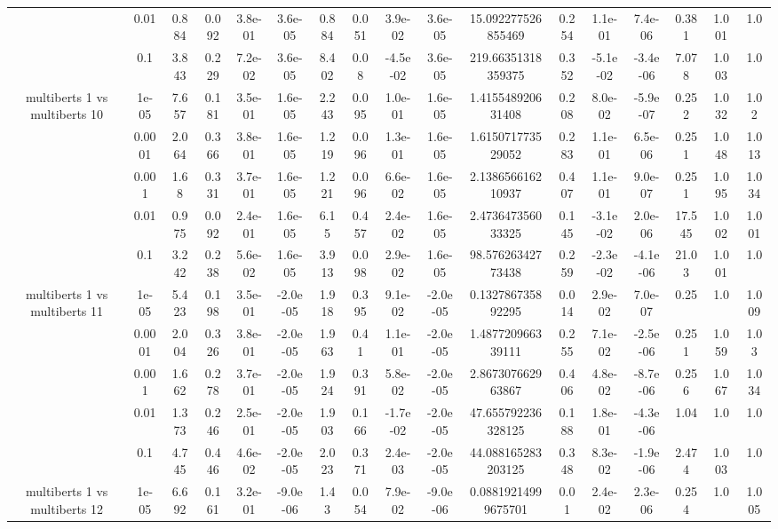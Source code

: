 \begin{tabular}{|c|c|c|c|c|c|c|c|c|c|c|c|c|c|c|c|c|}
 & 0.01 & 0.884 & 0.092 & 3.8e-01 & 3.6e-05 & 0.884 & 0.051 & 3.9e-02 & 3.6e-05 & 15.092277526855469 & 0.254 & 1.1e-01 & 7.4e-06 & 0.381 & 1.001 & 1.0 \\
 & 0.1 & 3.843 & 0.229 & 7.2e-02 & 3.6e-05 & 8.402 & 0.08 & -4.5e-02 & 3.6e-05 & 219.66351318359375 & 0.352 & -5.1e-02 & -3.4e-06 & 7.078 & 1.003 & 1.0 \\
\hline
\multirow{5}{*}{multiberts 1 vs multiberts 10} & 1e-05 & 7.657 & 0.181 & 3.5e-01 & 1.6e-05 & 2.243 & 0.095 & 1.0e-01 & 1.6e-05 & 1.415548920631408 & 0.208 & 8.0e-02 & -5.9e-07 & 0.252 & 1.032 & 1.02 \\
 & 0.0001 & 2.064 & 0.366 & 3.8e-01 & 1.6e-05 & 1.219 & 0.096 & 1.3e-01 & 1.6e-05 & 1.615071773529052 & 0.283 & 1.1e-01 & 6.5e-06 & 0.251 & 1.048 & 1.013 \\
 & 0.001 & 1.68 & 0.331 & 3.7e-01 & 1.6e-05 & 1.221 & 0.096 & 6.6e-02 & 1.6e-05 & 2.138656616210937 & 0.407 & 1.1e-01 & 9.0e-07 & 0.251 & 1.095 & 1.034 \\
 & 0.01 & 0.975 & 0.092 & 2.4e-01 & 1.6e-05 & 6.15 & 0.457 & 2.4e-02 & 1.6e-05 & 2.473647356033325 & 0.145 & -3.1e-02 & 2.0e-06 & 17.545 & 1.002 & 1.001 \\
 & 0.1 & 3.242 & 0.238 & 5.6e-02 & 1.6e-05 & 3.913 & 0.098 & 2.9e-02 & 1.6e-05 & 98.57626342773438 & 0.259 & -2.3e-02 & -4.1e-06 & 21.03 & 1.001 & 1.0 \\
\hline
\multirow{5}{*}{multiberts 1 vs multiberts 11} & 1e-05 & 5.423 & 0.198 & 3.5e-01 & -2.0e-05 & 1.918 & 0.395 & 9.1e-02 & -2.0e-05 & 0.132786735892295 & 0.014 & 2.9e-02 & 7.0e-07 & 0.25 & 1.0 & 1.009 \\
 & 0.0001 & 2.004 & 0.326 & 3.8e-01 & -2.0e-05 & 1.963 & 0.41 & 1.1e-01 & -2.0e-05 & 1.487720966339111 & 0.255 & 7.1e-02 & -2.5e-06 & 0.251 & 1.059 & 1.03 \\
 & 0.001 & 1.662 & 0.278 & 3.7e-01 & -2.0e-05 & 1.924 & 0.391 & 5.8e-02 & -2.0e-05 & 2.867307662963867 & 0.406 & 4.8e-02 & -8.7e-06 & 0.256 & 1.067 & 1.034 \\
 & 0.01 & 1.373 & 0.246 & 2.5e-01 & -2.0e-05 & 1.903 & 0.166 & -1.7e-02 & -2.0e-05 & 47.655792236328125 & 0.188 & 1.8e-01 & -4.3e-06 & 1.04 & 1.0 & 1.0 \\
 & 0.1 & 4.745 & 0.446 & 4.6e-02 & -2.0e-05 & 2.023 & 0.371 & 2.4e-03 & -2.0e-05 & 44.088165283203125 & 0.348 & 8.3e-02 & -1.9e-06 & 2.474 & 1.003 & 1.0 \\
\hline
\multirow{5}{*}{multiberts 1 vs multiberts 12} & 1e-05 & 6.692 & 0.161 & 3.2e-01 & -9.0e-06 & 1.43 & 0.054 & 7.9e-02 & -9.0e-06 & 0.08819214999675701 & 0.01 & 2.4e-02 & 2.3e-06 & 0.254 & 1.0 & 1.005 \\

\end{tabular}
